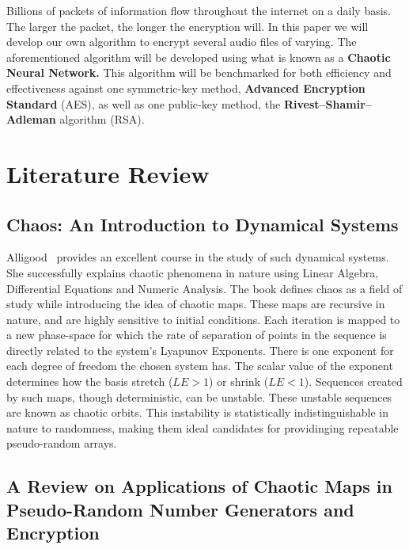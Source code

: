 \documentclass[conference]{IEEEtran}
\begin{document}
Billions of packets of information flow throughout the internet on a daily basis.
The larger the packet, the longer the encryption will.
In this paper we will develop our own algorithm to encrypt several audio files of varying.
The aforementioned algorithm will be developed using what is known as a \textbf{Chaotic Neural Network.}
This algorithm will be benchmarked for both efficiency and effectiveness against one symmetric-key method, \textbf{Advanced Encryption Standard} (AES), as well as one public-key method, the \textbf{Rivest–Shamir–Adleman} algorithm (RSA).

\section{Literature Review}\label{sec:literature-review}

\subsection{\textbf{Chaos: An Introduction to Dynamical Systems}}\label{subsec:chaos:-an-introduction-to-dynamical-systems}

Alligood~\cite{Alligood} provides an excellent course in the study of such dynamical systems.
She successfully explains chaotic phenomena in nature using Linear Algebra, Differential Equations and Numeric Analysis.
The book defines chaos as a field of study while introducing the idea of chaotic maps.
These maps are recursive in nature, and are highly sensitive to initial conditions.
Each iteration is mapped to a new phase-space for which the rate of separation of points in the sequence is directly related to the system's Lyapunov Exponents.
There is one exponent for each degree of freedom the chosen system has.
The scalar value of the exponent determines how the basis stretch ($LE > 1$) or shrink ($LE < 1$).
Sequences created by such maps, though deterministic, can be unstable.
These unstable sequences are known as chaotic orbits.
This instability is statistically indistinguishable in nature to randomness, making them ideal candidates for providinging repeatable pseudo-random arrays.

\subsection{\textbf{A Review on Applications of Chaotic Maps in Pseudo-Random Number Generators and Encryption}}\label{subsec:a-review-on-applications-of-chaotic-maps-in-pseudo-random-number-generators-and-encryption}
\end{document}
